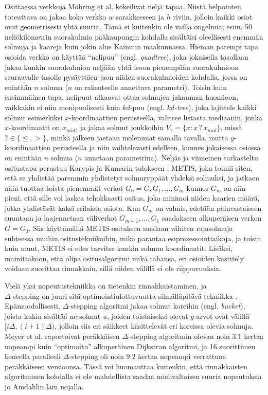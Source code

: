 \documentclass[12pt]{article}
\begin{document}
Osittaessa verkkoja Möhring et al. kokeilivat neljä tapaa. Niistä helpointen toteuttava on jakaa koko verkko $w$ sarakkeeseen ja $h$ riviin, jolloin kaikki osiot ovat geometrisesti yhtä suuria. Tämä ei kuitenkin ole vailla ongelmia; esim. 50 neliökilometrin suorakulmio pääkaupungin kohdalla sisältäisi oleellisesti enemmän solmuja ja kaareja kuin jokin alue Kainuun maakunnassa. Hieman parempi tapa osioida verkko on käyttää ``nelipuu'' (engl. \textit{quadtree}), joka jokaisella tasollaan jakaa kunkin suorakulmion neljään yhtä isoon pienempään suorakulmioon seuraavalle tasolle pysäyttäen jaon niiden suorakulmioiden kohdalla, jossa on enintään $n$ solmua ($n$ on rakenteelle annettava parametri). Toisin kuin ensimmäinen tapa, nelipuut alkaavat ottaa solmujen jakauman huomioon, vaikkakin ei niin monipuolisesti kuin $kd$-puu (engl. \textit{$kd$-tree}), joka lajittele kaikki solmut esimerkiksi $x$-koordinaattien perusteella, valitsee listasta mediaanin, jonka $x$-koordinaatti on $x_{mid}$, ja jakaa solmut joukkoihin $V_? = \{ x \colon x \, ? \, x_{mid} \}$, missä $? \in \{ \leq, >\}$, minkä jälkeen jaetaan molemmat samalla tavalla, mutta $y$-koordinaattien perusteella ja niin vaihtelevasti edelleen, kunnes jokaisessa osiossa on enintään $n$ solmua ($n$ annetaan parametrina). Neljäs ja viimeinen tarkasteltu ositustapa perustuu Karypis ja Kumarin tulokseen \cite{Karypis98}: METIS, joka toimii siten, että se yhdistää paremmin yhdistetyt solmuryppäät yhdeksi solmuksi, ja jatkaen näin tuottaa toista pienemmät verkot $G_0 = G, G_1, \dots, G_m$ kunnes $G_m$ on niin pieni, että sille voi laskea tehokkaasti ositus, joka minimoi niiden kaarien määrä, jotka yhdistävät kaksi erilaista osiota. Kun $G_m$ on valmis, edetään päinvastaiseen suuntaan ja laajennetaan väliverkot $G_{m - 1}, \dots, G_1$ saadakseen alkuperäisen verkon $G = G_0$. Siis käyttämällä METIS-osituksen saadaan vähiten rajasolmuja suhteessa muihin ositustekniikoihin, mikä parantaa esiprosessointiaikoja, ja toisin kuin muut, METIS ei edes tarvitse kunkin solmun koordinaatit. Lisäksi, mainittakoon, että olipa ositusalgoritmi mikä tahansa, eri osioiden käsittely voidaan suorittaa rinnakkain, sillä niiden välillä ei ole riippuvuuksia.

Vielä yksi nopeutustekniikka on tietenkin rinnakkaistaminen, ja \\ $\Delta$-stepping on juuri sitä optimointiulottuvuutta silmälläpitävä tekniikka \cite{Meyer98}. Epämuo\-dollisesti, $\Delta$-stepping algoritmi jakaa solmut koreihin (engl. \textit{bucket}), joista kukin sisältää ne solmut $u$, joiden toistaiseksi olevat $g$-arvot ovat välillä $[i\Delta, (i +1)\Delta)$, jolloin siis eri säikkeet käsittelevät eri koreissa olevia solmuja. Meyer et al. raportoivat peräkkäisen $\Delta$-stepping algoritmin olevan noin $3.1$ kertaa nopeampi kuin ``optimoitu'' alkuperäinen Dijkstran algoritmi, ja 16 suorittimen koneella paralleeli $\Delta$-stepping oli noin $9.2$ kertaa nopeampi verrattuna peräkkäiseen versioonsa. Tässä voi huomauttaa kuitenkin, että rinnakkaisten algoritminen kohdalla ei ole mahdollista saadaa mielivaltaisen suuria nopeutuksia jo Amdahlin lain nojalla.


\end{document}
